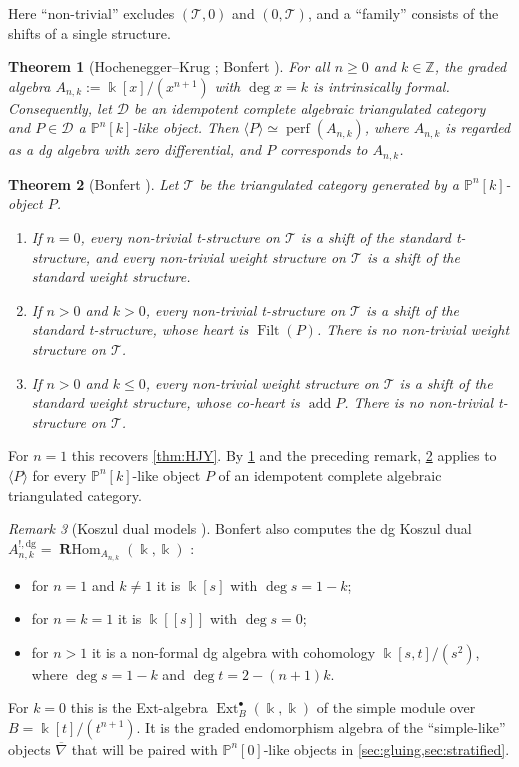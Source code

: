 \documentclass[11pt,reqno]{amsart}
\theoremstyle{plain}
\newtheorem{theorem}{Theorem}[section]
\theoremstyle{definition}
\theoremstyle{remark}
\newtheorem{remark}[theorem]{Remark}
\newcommand{\kk}{\Bbbk}
\DeclareMathOperator{\Ext}{Ext}
\DeclareMathOperator{\Filt}{Filt}
\DeclareMathOperator{\add}{add}
\DeclareMathOperator{\RHom}{\mathbf{R}Hom}
\newcommand{\thick}[1]{\langle #1\rangle}
\newcommand{\Pn}[2]{\mathbb{P}^{#1}[#2]}
\newcommand{\nablabar}{\overline{\nabla}}
\newcommand{\cD}{\mathcal{D}}
\newcommand{\cT}{\mathcal{T}}
\begin{document}
Here ``non-trivial'' excludes $(\cT,0)$ and $(0,\cT)$, and a ``family'' consists of the shifts of a single structure.

\begin{theorem}[{Hochenegger--Krug \cite[Lemma~2.8]{HK19}; Bonfert \cite[Props.~2.3 and~2.4]{Bonf26}}]\label{thm:formality}
For all $n\ge0$ and $k\in\mathbb{Z}$, the graded algebra $A_{n,k}:=\kk[x]/(x^{n+1})$ with $\deg x=k$ is intrinsically formal. Consequently, let $\cD$ be an idempotent complete algebraic triangulated category and $P\in\cD$ a $\Pn nk$-like object. Then $\thick P\simeq\operatorname{perf}(A_{n,k})$, where $A_{n,k}$ is regarded as a dg algebra with zero differential, and $P$ corresponds to $A_{n,k}$.
\end{theorem}

\begin{theorem}[{Bonfert \cite[Thm.~3.3]{Bonf26}}]\label{thm:Bonfert}
Let $\cT$ be the triangulated category generated by a $\Pn nk$-object $P$.
\begin{enumerate}
\item If $n=0$, every non-trivial t-structure on $\cT$ is a shift of the standard t-structure, and every non-trivial weight structure on $\cT$ is a shift of the standard weight structure.
\item If $n>0$ and $k>0$, every non-trivial t-structure on $\cT$ is a shift of the standard t-structure, whose heart is $\Filt(P)$. There is no non-trivial weight structure on $\cT$.
\item If $n>0$ and $k\le0$, every non-trivial weight structure on $\cT$ is a shift of the standard weight structure, whose co-heart is $\add P$. There is no non-trivial t-structure on $\cT$.
\end{enumerate}
\end{theorem}

For $n=1$ this recovers \cref{thm:HJY}. By \cref{thm:formality} and the preceding remark, \cref{thm:Bonfert} applies to $\thick P$ for every $\Pn nk$-like object $P$ of an idempotent complete algebraic triangulated category.

\begin{remark}[{Koszul dual models \cite[\S4]{Bonf26}}]\label{rem:Bonfert-Koszul}
Bonfert also computes the dg Koszul dual $A_{n,k}^{!,\mathrm{dg}}=\RHom_{A_{n,k}}(\kk,\kk)$ \cite[Thm.~4.9, Props.~4.11 and~4.12]{Bonf26}:
\begin{itemize}
\item for $n=1$ and $k\ne1$ it is $\kk[s]$ with $\deg s=1-k$;
\item for $n=k=1$ it is $\kk[[s]]$ with $\deg s=0$;
\item for $n>1$ it is a non-formal dg algebra with cohomology $\kk[s,t]/(s^2)$, where $\deg s=1-k$ and $\deg t=2-(n+1)k$.
\end{itemize}
For $k=0$ this is the Ext-algebra $\Ext^\bullet_B(\kk,\kk)$ of the simple module over $B=\kk[t]/(t^{n+1})$. It is the graded endomorphism algebra of the ``simple-like'' objects $\nablabar$ that will be paired with $\Pn n0$-like objects in \cref{sec:gluing,sec:stratified}.
\end{remark}
\end{document}
